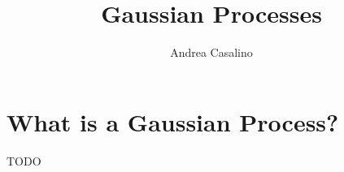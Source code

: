 \documentclass{article}
\author{Andrea Casalino}
\title{Gaussian Processes}
\begin{document}
\maketitle

\newpage
\section{What is a Gaussian Process?}

TODO
\end{document}
